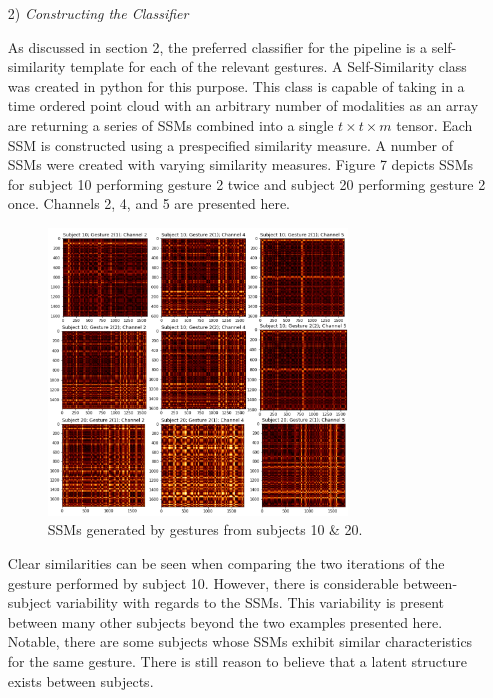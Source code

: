 \documentclass[11pt]{article}
\begin{document}
\begin{enumerate}
\begin{enumerate}
\item[2)] \textit{Constructing the Classifier}

As discussed in section 2, the preferred classifier for the pipeline is a self-similarity template for each of the relevant gestures. A Self-Similarity class was created in python for this purpose. This class is capable of taking in a time ordered point cloud with an arbitrary number of modalities as an array are returning a series of SSMs combined into a single $t \times t \times m$ tensor. Each SSM is constructed using a prespecified similarity measure. A number of SSMs were created with varying similarity measures. Figure 7 depicts SSMs for subject 10 performing gesture 2 twice and subject 20 performing gesture 2 once. Channels 2, 4, and 5 are presented here.

\begin{figure}[h]
\centering
\includegraphics[width=0.75\textwidth]{all_ssm}
\caption{SSMs generated by gestures from subjects 10 \& 20.}
\end{figure}

\newpage

Clear similarities can be seen when comparing the two iterations of the gesture performed by subject 10. However, there is considerable between-subject variability with regards to the SSMs. This variability is present between many other subjects beyond the two examples presented here. Notable, there are some subjects whose SSMs exhibit similar characteristics for the same gesture. There is still reason to believe that a latent structure exists between subjects.


\end{enumerate}
\end{enumerate}
\end{document}
